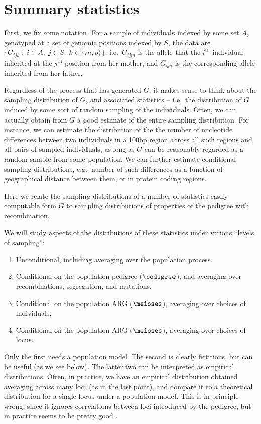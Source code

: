 

\section{Summary statistics}

First, we fix some notation.
For a sample of individuals indexed by some set $A$,
genotyped at a set of genomic positions indexed by $S$,
the data are $\{G_{ijk} \; : \; i \in A, \; j \in S, \; k \in \{m,p\} \}$,
i.e.\ $G_{ijm}$ is the allele that the $i^\mathrm{th}$ individual inherited at the $j^\mathrm{th}$ position from her mother,
and $G_{ijp}$ is the corresponding allele inherited from her father.

Regardless of the process that has generated $G$, 
it makes sense to think about the sampling distribution of $G$,
and associated statistics --
i.e.\ the distribution of $G$ induced by some sort of random sampling of the individuals.
Often, we can actually obtain from $G$ a good estimate of the entire sampling distribution.
For instance, we can estimate the distribution of 
the the number of nucleotide differences between two individuals in a 100bp region
across all such regions and all pairs of sampled individuals,
as long as $G$ can be reasonably regarded as a random sample from some population.
We can further estimate conditional sampling distributions,
e.g.\ number of such differences as a function of geographical distance between them,
or in protein coding regions.

Here we relate the sampling distributions of a number of statistics easily computable form $G$
to sampling distributions of properties of the pedigree with recombination.

We will study aspects of the distributions of these statistics under various ``levels of sampling'':
\begin{enumerate}
  \item Unconditional, including averaging over the population process.
  \item Conditional on the population pedigree ($\pedigree$),
    and averaging over recombinations, segregation, and mutations.
  \item Conditional on the population ARG ($\meioses$), 
    averaging over choices of individuals.
  \item Conditional on the population ARG ($\meioses$),
    averaging over choices of locus.
\end{enumerate}
Only the first needs a population model.
The second is clearly fictitious, but can be useful (as we see below).
The latter two can be interpreted as empirical distributions.
Often, in practice, we have an empirical distribution obtained averaging across many loci (as in the last point),
and compare it to a theoretical distribution for a single locus under a population model.
This is in principle wrong, 
since it ignores correlations between loci introduced by the pedigree,
but in practice seems to be pretty good \citep{wakeley2012genealogies}.


